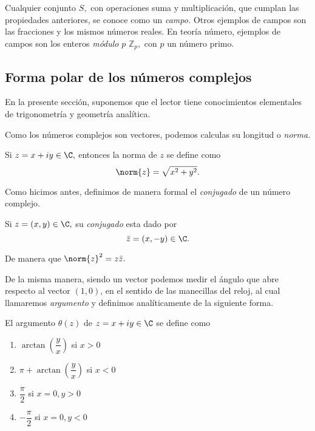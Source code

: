 \begin{observacion}
	Cualquier conjunto $S,$ con operaciones suma y multiplicación, que cumplan las propiedades anteriores, se conoce como
	un \emph{campo.} Otros ejemplos de campos son las fracciones y los mismos números reales. En teoría número, ejemplos de
	campos son los enteros \emph{módulo} $p$ $\mathbb{Z}_{p},$ con $p$ un número primo.
\end{observacion}

\subsection{Forma polar de los números complejos}

En la presente sección, suponemos que el lector tiene conocimientos elementales de trigonometría y geometría analítica. 

Como los números complejos son vectores, podemos calculas su longitud o \emph{norma.}

\begin{definicion}
	Si $z=x+iy\in \C,$ entonces la norma de $z$ se define como
	$$
	\norm{z}=\sqrt{x^{2}+y^{2}}.
	$$
\end{definicion}

Como hicimos antes, definimos de manera formal el \emph{conjugado} de un número complejo.
\begin{definicion}
	Si $z=(x,y)\in \C,$ su \emph{conjugado} esta dado por
	$$
	\bar{z}=(x,-y)\in \C.
	$$
\end{definicion}

De manera que $\norm{z}^{2}=z\bar{z}.$

De la misma manera, siendo un vector podemos medir el ángulo que abre respecto al vector $(1,0)$, en el sentido de las
manecillas del reloj, al cual llamaremos \emph{argumento} y definimos analíticamente de la siguiente forma.
\begin{definicion}
	El argumento $\theta(z)$ de $z=x+iy\in \C$ se define como
	\begin{enumerate}
		\item $\arctan\left( \dfrac{y}{x} \right)$ si $x>0$
		\item $\pi + \arctan\left( \dfrac{y}{x} \right)$ si $x<0$
		\item $\dfrac{\pi}{2}$ si $x=0, y> 0$
		\item $-\dfrac{\pi}{2}$ si $x=0, y< 0$
	\end{enumerate}
	
\end{definicion}

